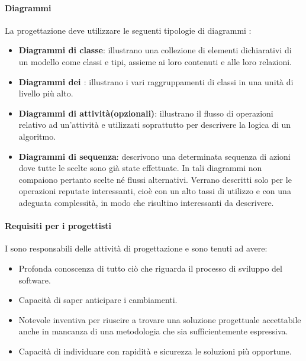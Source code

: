 \paragraph{Diagrammi}
La progettazione deve utilizzare le seguenti tipologie di diagrammi :
\begin{itemize}
\item
\textbf{Diagrammi di classe}: illustrano una collezione di elementi dichiarativi di un modello come classi e tipi, assieme ai loro contenuti e alle loro relazioni.
\item
\textbf{Diagrammi dei \textit{}}: illustrano i vari raggruppamenti di classi in una unità di livello più alto.
\item
\textbf{Diagrammi di attività(opzionali)}: illustrano il flusso di operazioni relativo ad un'attività e utilizzati soprattutto per descrivere la logica di un algoritmo.
\item
\textbf{Diagrammi di sequenza}: descrivono una determinata sequenza di azioni dove tutte le scelte sono già state effettuate. In tali diagrammi non compaiono pertanto scelte né flussi alternativi. Verrano descritti solo per le operazioni reputate interessanti, cioè con un alto tassi di utilizzo e con una adeguata complessità, in modo che risultino interessanti da descrivere.
\end{itemize}

\paragraph{Requisiti per i progettisti}
I \textit{\ProgP} sono responsabili delle attività di progettazione e sono tenuti ad avere:
\begin{itemize}
\item
Profonda conoscenza di tutto ciò che riguarda il processo di sviluppo del software.
\item
Capacità di saper anticipare i cambiamenti.
\item
Notevole inventiva per riuscire a trovare una soluzione progettuale accettabile anche in mancanza di una metodologia che sia sufficientemente espressiva.
\item
Capacità di individuare con rapidità e sicurezza le soluzioni più opportune.
\end{itemize}

